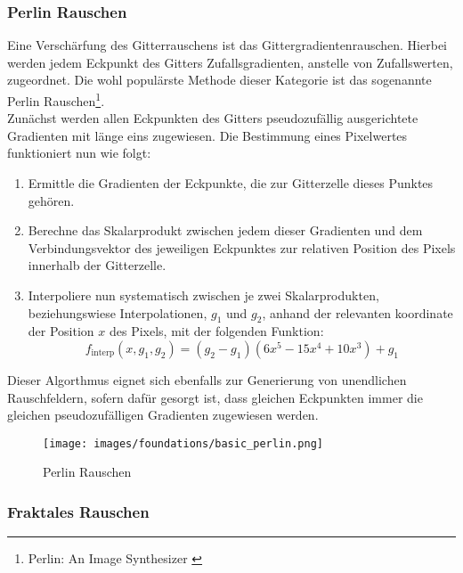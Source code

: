 \subsubsection{Perlin Rauschen}

Eine Verschärfung des Gitterrauschens ist das Gittergradientenrauschen. Hierbei werden jedem Eckpunkt des Gitters Zufallsgradienten, anstelle von Zufallswerten, zugeordnet. Die wohl populärste Methode dieser Kategorie ist das sogenannte Perlin Rauschen\footnote{
    Perlin: An Image Synthesizer
    \cite{perlin1985image}
}. \\
Zunächst werden allen Eckpunkten des Gitters pseudozufällig ausgerichtete Gradienten mit länge eins zugewiesen. Die Bestimmung eines Pixelwertes funktioniert nun wie folgt:
\begin{enumerate}
    \item Ermittle die Gradienten der Eckpunkte, die zur Gitterzelle dieses Punktes gehören.
    \item Berechne das Skalarprodukt zwischen jedem dieser Gradienten und dem Verbindungsvektor des jeweiligen Eckpunktes zur relativen Position des Pixels innerhalb der Gitterzelle.
    \item Interpoliere nun systematisch zwischen je zwei Skalarprodukten, beziehungswiese Interpolationen, $g_1$ und $g_2$, anhand der relevanten koordinate der Position $x$ des Pixels, mit der folgenden Funktion:
    \begin{equation}
        f_\text{interp}(x, g_1, g_2) = (g_2 - g_1)(6x^5 - 15x^4 + 10x^3) 
        + g_1
    \end{equation}
\end{enumerate}
Dieser Algorthmus eignet sich ebenfalls zur Generierung von unendlichen Rauschfeldern, sofern dafür gesorgt ist, dass gleichen Eckpunkten immer die gleichen pseudozufälligen Gradienten zugewiesen werden. 

\begin{figure}[ht]
    \centering
    \texttt{[image: images/foundations/basic\_perlin.png]} 
    \caption{Perlin Rauschen}
    \label{fig:basic_perlin}
\end{figure}


\subsubsection{Fraktales Rauschen}

